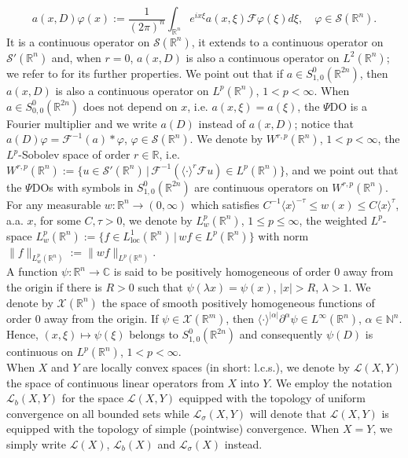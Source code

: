 \documentclass[12pt,reqno]{amsart}
\newcommand{\NN}{\mathbb N}
\newcommand{\CC}{\mathbb C}
\newcommand{\RR}{\mathbb R}
\newcommand{\SSS}{\mathcal S}
\newcommand{\XX}{\mathcal X}
\theoremstyle{plain}
\theoremstyle{remark}
\theoremstyle{definition}
\numberwithin{equation}{section}
\begin{document}
\begin{equation*}
a(x,D)\varphi(x):=\frac{1}{(2\pi)^n}\int_{\RR^n}e^{i x\xi}a(x,\xi)\mathcal{F}\varphi(\xi)d\xi,\quad \varphi\in\SSS(\RR^n).
\end{equation*}
It is a continuous operator on $\SSS(\RR^n)$, it extends to a continuous operator on $\SSS'(\RR^n)$ and, when $r=0$, $a(x,D)$ is also a continuous operator on $L^2(\RR^n)$; we refer to \cite{hor2} for its further properties. We point out that if $a\in S^0_{1,0}(\RR^{2n})$, then $a(x,D)$ is also a continuous operator on $L^p(\RR^n)$, $1<p<\infty$. When $a\in S^0_{0,0}(\RR^{2n})$ does not depend on $x$, i.e. $a(x,\xi)=a(\xi)$, the $\Psi$DO is a Fourier multiplier and we write $a(D)$ instead of $a(x,D)$; notice that $a(D)\varphi=\mathcal{F}^{-1}(a)*\varphi$, $\varphi\in\SSS(\RR^n)$. We denote by $W^{r,p}(\RR^n)$, $1<p<\infty$, the $L^p$-Sobolev space of order $r\in\RR$, i.e. $W^{r,p}(\RR^n):=\{u\in\SSS'(\RR^n)\,|\, \mathcal{F}^{-1}(\langle\cdot\rangle^r \mathcal{F}u)\in L^p(\RR^n)\}$, and we point out that the $\Psi$DOs with symbols in $S^0_{1,0}(\RR^{2n})$ are continuous operators on $W^{r,p}(\RR^n)$.\\
\indent For any measurable $w:\RR^n\rightarrow(0,\infty)$ which satisfies $C^{-1}\langle x\rangle^{-\tau}\leq w(x)\leq C\langle x\rangle^{\tau}$, a.a. $x$, for some $C,\tau> 0$, we denote by $L^p_w(\RR^n)$, $1\leq p\leq \infty$, the weighted $L^p$-space $L^p_w(\RR^n):=\{f\in L^1_{\operatorname{loc}}(\RR^n)\,|\, wf\in L^p(\RR^n)\}$ with norm $\|f\|_{L^p_w(\RR^n)}:=\|wf\|_{L^p(\RR^n)}$.\\
\indent A function $\psi:\RR^n\rightarrow \CC$ is said to be positively homogeneous of order $0$ away from the origin if there is $R>0$ such that $\psi(\lambda x)=\psi(x)$, $|x|>R$, $\lambda>1$. We denote by $\XX(\RR^n)$ the space of smooth positively homogeneous functions of order $0$ away from the origin. If $\psi\in\XX(\RR^m)$, then $\langle\cdot\rangle^{|\alpha|} \partial^{\alpha}\psi\in L^{\infty}(\RR^n)$, $\alpha\in\NN^n$. Hence, $(x,\xi)\mapsto \psi(\xi)$ belongs to $S^0_{1,0}(\RR^{2n})$ and consequently $\psi(D)$ is continuous on $L^p(\RR^n)$, $1<p<\infty$.\\
\indent When $X$ and $Y$ are locally convex spaces (in short: l.c.s.), we denote by $\mathcal{L}(X,Y)$ the space of continuous linear operators from $X$ into $Y$. We employ the notation $\mathcal{L}_b(X,Y)$ for the space $\mathcal{L}(X,Y)$ equipped with the topology of uniform convergence on all bounded sets while $\mathcal{L}_{\sigma}(X,Y)$ will denote that $\mathcal{L}(X,Y)$ is equipped with the topology of simple (pointwise) convergence. When $X=Y$, we simply write $\mathcal{L}(X)$, $\mathcal{L}_b(X)$ and $\mathcal{L}_{\sigma}(X)$ instead.
\end{document}
